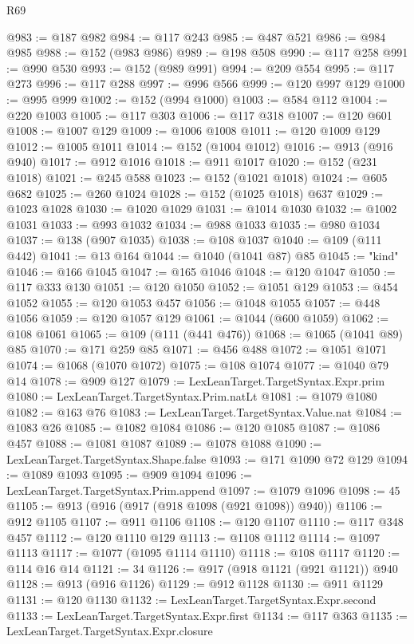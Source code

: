 \begin{lexlean}{R69}
\begin{coremodule}
@983 := @187 @982
@984 := @117 @243
@985 := @487 @521
@986 := @984 @985
@988 := @152 (@983 @986)
@989 := @198 @508
@990 := @117 @258
@991 := @990 @530
@993 := @152 (@989 @991)
@994 := @209 @554
@995 := @117 @273
@996 := @117 @288
@997 := @996 @566
@999 := @120 @997 @129
@1000 := @995 @999
@1002 := @152 (@994 @1000)
@1003 := @584 @112
@1004 := @220 @1003
@1005 := @117 @303
@1006 := @117 @318
@1007 := @120 @601
@1008 := @1007 @129
@1009 := @1006 @1008
@1011 := @120 @1009 @129
@1012 := @1005 @1011
@1014 := @152 (@1004 @1012)
@1016 := @913 (@916 @940)
@1017 := @912 @1016
@1018 := @911 @1017
@1020 := @152 (@231 @1018)
@1021 := @245 @588
@1023 := @152 (@1021 @1018)
@1024 := @605 @682
@1025 := @260 @1024
@1028 := @152 (@1025 @1018) @637
@1029 := @1023 @1028
@1030 := @1020 @1029
@1031 := @1014 @1030
@1032 := @1002 @1031
@1033 := @993 @1032
@1034 := @988 @1033
@1035 := @980 @1034
@1037 := @138 (@907 @1035)
@1038 := @108 @1037
@1040 := @109 (@111 @442)
@1041 := @13 @164
@1044 := @1040 (@1041 @87) @85
@1045 := "kind"
@1046 := @166 @1045
@1047 := @165 @1046
@1048 := @120 @1047
@1050 := @117 @333 @130
@1051 := @120 @1050
@1052 := @1051 @129
@1053 := @454 @1052
@1055 := @120 @1053 @457
@1056 := @1048 @1055
@1057 := @448 @1056
@1059 := @120 @1057 @129
@1061 := @1044 (@600 @1059)
@1062 := @108 @1061
@1065 := @109 (@111 (@441 @476))
@1068 := @1065 (@1041 @89) @85
@1070 := @171 @259 @85
@1071 := @456 @488
@1072 := @1051 @1071
@1074 := @1068 (@1070 @1072)
@1075 := @108 @1074
@1077 := @1040 @79 @14
@1078 := @909 @127
@1079 := LexLeanTarget.TargetSyntax.Expr.prim
@1080 := LexLeanTarget.TargetSyntax.Prim.natLt
@1081 := @1079 @1080
@1082 := @163 @76
@1083 := LexLeanTarget.TargetSyntax.Value.nat
@1084 := @1083 @26
@1085 := @1082 @1084
@1086 := @120 @1085
@1087 := @1086 @457
@1088 := @1081 @1087
@1089 := @1078 @1088
@1090 := LexLeanTarget.TargetSyntax.Shape.false
@1093 := @171 @1090 @72 @129
@1094 := @1089 @1093
@1095 := @909 @1094
@1096 := LexLeanTarget.TargetSyntax.Prim.append
@1097 := @1079 @1096
@1098 := 45
@1105 := @913 (@916 (@917 (@918 @1098 (@921 @1098)) @940))
@1106 := @912 @1105
@1107 := @911 @1106
@1108 := @120 @1107
@1110 := @117 @348 @457
@1112 := @120 @1110 @129
@1113 := @1108 @1112
@1114 := @1097 @1113
@1117 := @1077 (@1095 @1114 @1110)
@1118 := @108 @1117
@1120 := @114 @16 @14
@1121 := 34
@1126 := @917 (@918 @1121 (@921 @1121)) @940
@1128 := @913 (@916 @1126)
@1129 := @912 @1128
@1130 := @911 @1129
@1131 := @120 @1130
@1132 := LexLeanTarget.TargetSyntax.Expr.second
@1133 := LexLeanTarget.TargetSyntax.Expr.first
@1134 := @117 @363
@1135 := LexLeanTarget.TargetSyntax.Expr.closure

\end{coremodule}
\end{lexlean}
